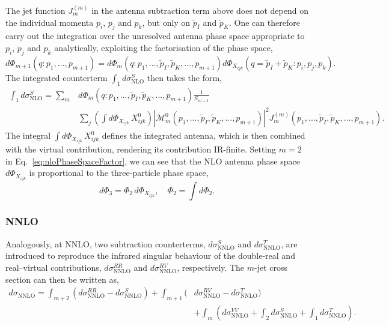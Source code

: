 

The jet function $J_m^{(m)}$ in the antenna subtraction term above does not depend on
the individual momenta $p_i$, $p_j$ and $p_k$, but only on $\tilde p_I$ and
$\tilde p_K$. One can therefore carry out the integration over the unresolved
antenna phase space appropriate to $p_i$, $p_j$ and $p_k$ analytically, exploiting
the factorisation of the phase space,
\begin{equation}\label{eq:nloPhaseSpaceFactor}
    d\Phi_{m+1}(q:p_1,...,p_{m+1}) = d\Phi_m(q:p_1,...,\tilde p_I,\tilde p_K,...,p_{m+1})d\Phi_{X_{ijk}}(q=\tilde p_I+\tilde p_K:p_i,p_j,p_k).
\end{equation}
The integrated counterterm $\int_1 d\sigma^S_\text{NLO}$ then takes the form,
\begin{equation}
    \begin{aligned}
        \int_1 d\sigma^S_\text{NLO} = \sum_m &d\Phi_m(q:p_1,...,\tilde p_I,\tilde p_K,...,p_{m+1})\frac1{S_{m+1}}\\&\sum_j\left(\int d\Phi_{X_{ijk}}\,X_{ijk}^0\right)|\mathcal M_m^0(p_1,...,\tilde p_I,\tilde p_K,...,p_{m+1})|^2J_m^{(m)}(p_1,...,\tilde p_I,\tilde p_K,...,p_{m+1}).
    \end{aligned}
\end{equation}
The integral $\int d\Phi_{X_{ijk}}\,X_{ijk}^0$ defines the integrated antenna,
which is then combined with the virtual contribution, rendering its contribution
IR-finite. Setting $m=2$ in Eq.~\eqref{eq:nloPhaseSpaceFactor}, we can see that the
NLO antenna phase space $d\Phi_{X_{ijk}}$ is proportional to the three-particle
phase space,
\begin{equation}
    d\Phi_3=\Phi_2\,d\Phi_{X_{ijk}},\quad \Phi_2=\int d\Phi_2.
\end{equation}

\subsubsection{NNLO}

Analogously, at NNLO, two subtraction counterterms, $d\sigma_\text{NNLO}^S$
and $d\sigma_\text{NNLO}^T$, are introduced to reproduce the infrared singular
behaviour of the double-real and real--virtual contributions,
$d\sigma_\text{NNLO}^{RR}$ and $d\sigma_\text{NNLO}^{RV}$, respectively. The
$m$-jet cross section can then be written as,
\begin{equation}
    \begin{aligned}
        d\sigma_\text{NNLO} = \int_{m+2}\left(d\sigma_\text{NNLO}^{RR}-d\sigma_\text{NNLO}^{S}\right)+\int_{m+1}\Big(&d\sigma_\text{NNLO}^{RV}-d\sigma_\text{NNLO}^T\Big)\\
                                                                                                                     &+\int_m \left(d\sigma_\text{NNLO}^{VV}+\int_2 d\sigma_\text{NNLO}^{S}+\int_1 d\sigma_\text{NNLO}^T\right).
    \end{aligned}
\end{equation}

